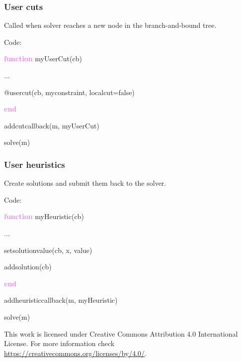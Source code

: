 \documentclass{beamer}
\begin{document}
\begin{frame}
  \frametitle{User cuts}
  Called when solver reaches a new node in the branch-and-bound tree.

  \begin{block}{Code:}\footnotesize
    
    \textcolor{violet}{\textbf{function}} myUserCut(cb)
    
    \hspace{1cm}    ...
    
    \hspace{1cm}    @usercut(cb, myconstraint, localcut=false)

    \textcolor{violet}{\bf end}
    
    addcutcallback(m, myUserCut)

    solve(m)
  \end{block}
  
\end{frame}


\begin{frame}
  \frametitle{User heuristics}

  Create solutions and submit them back to the solver.

  \begin{block}{Code:}\footnotesize
    
    \textcolor{violet}{\textbf{function}} myHeuristic(cb)
    
    \hspace{1cm}    ...
    
    \hspace{1cm}    setsolutionvalue(cb, x, value)
    
    \hspace{1cm}    addsolution(cb)

    \textcolor{violet}{\bf end}
    
    addheuristiccallback(m, myHeuristic)

    solve(m)
  \end{block}

\end{frame}


\begin{frame}
  \vfill
  \centering
  This work is licensed under Creative Commons Attribution 4.0 International License.
  For more information check \url{https://creativecommons.org/licenses/by/4.0/}.
  \vfill
\end{frame}
\end{document}
